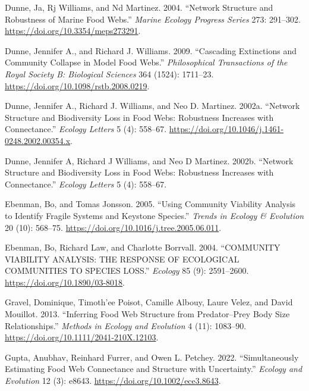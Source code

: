 \documentclass{article}
\newlength{\cslhangindent}
\newlength{\cslentryspacingunit} %
\newenvironment{CSLReferences}[2] %
 {%
  \setlength{\parindent}{0pt}
  \ifodd #1
  \let\oldpar\par
  \def\par{\hangindent=\cslhangindent\oldpar}
  \fi
  \setlength{\parskip}{#2\cslentryspacingunit}
 }%
 {}
\begin{document}
\begin{CSLReferences}{1}{0}
\leavevmode{}%
Dunne, Ja, Rj Williams, and Nd Martinez. 2004. {``Network Structure and
Robustness of Marine Food Webs.''} \emph{Marine Ecology Progress Series}
273: 291--302. \url{https://doi.org/10.3354/meps273291}.

\leavevmode{}%
Dunne, Jennifer A., and Richard J. Williams. 2009. {``Cascading
Extinctions and Community Collapse in Model Food Webs.''}
\emph{Philosophical Transactions of the Royal Society B: Biological
Sciences} 364 (1524): 1711--23.
\url{https://doi.org/10.1098/rstb.2008.0219}.

\leavevmode{}%
Dunne, Jennifer A., Richard J. Williams, and Neo D. Martinez. 2002a.
{``Network Structure and Biodiversity Loss in Food Webs: Robustness
Increases with Connectance.''} \emph{Ecology Letters} 5 (4): 558--67.
\url{https://doi.org/10.1046/j.1461-0248.2002.00354.x}.

\leavevmode{}%
Dunne, Jennifer A, Richard J Williams, and Neo D Martinez. 2002b.
{``Network Structure and Biodiversity Loss in Food Webs: Robustness
Increases with Connectance.''} \emph{Ecology Letters} 5 (4): 558--67.

\leavevmode{}%
Ebenman, Bo, and Tomas Jonsson. 2005. {``Using Community Viability
Analysis to Identify Fragile Systems and Keystone Species.''}
\emph{Trends in Ecology \& Evolution} 20 (10): 568--75.
\url{https://doi.org/10.1016/j.tree.2005.06.011}.

\leavevmode{}%
Ebenman, Bo, Richard Law, and Charlotte Borrvall. 2004. {``{COMMUNITY
VIABILITY ANALYSIS}: {THE RESPONSE OF ECOLOGICAL COMMUNITIES TO SPECIES
LOSS}.''} \emph{Ecology} 85 (9): 2591--2600.
\url{https://doi.org/10.1890/03-8018}.

\leavevmode{}%
Gravel, Dominique, Timoth'ee Poisot, Camille Albouy, Laure Velez, and
David Mouillot. 2013. {``Inferring Food Web Structure from
Predator--Prey Body Size Relationships.''} \emph{Methods in Ecology and
Evolution} 4 (11): 1083--90.
\url{https://doi.org/10.1111/2041-210X.12103}.

\leavevmode{}%
Gupta, Anubhav, Reinhard Furrer, and Owen L. Petchey. 2022.
{``Simultaneously Estimating Food Web Connectance and Structure with
Uncertainty.''} \emph{Ecology and Evolution} 12 (3): e8643.
\url{https://doi.org/10.1002/ece3.8643}.


\end{CSLReferences}
\end{document}

